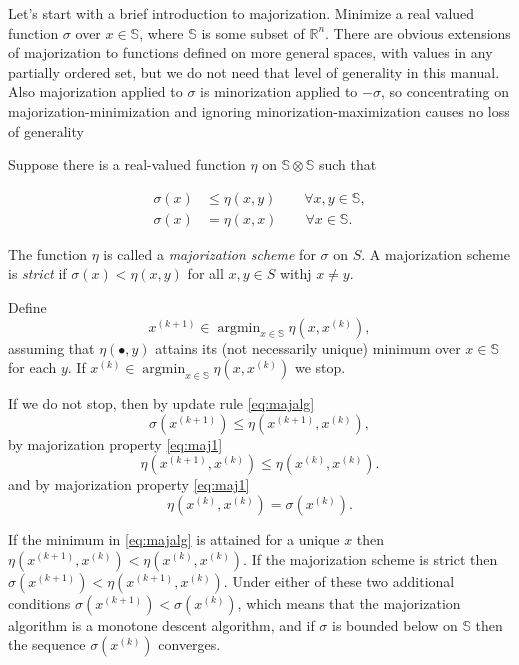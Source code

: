 \documentclass[
  12pt,
]{article}
\begin{document}
Let's start with a brief introduction to majorization. Minimize a real valued function \(\sigma\) over \(x\in\mathbb{S}\), where \(\mathbb{S}\) is some subset of \(\mathbb{R}^n\).
There are obvious extensions of majorization to functions defined on more general spaces, with values in any partially ordered set, but we do not need that level of generality in this manual. Also majorization applied to \(\sigma\) is minorization applied to \(-\sigma\), so concentrating
on majorization-minimization and ignoring minorization-maximization causes no loss of generality

Suppose there is a real-valued function
\(\eta\) on \(\mathbb{S}\otimes\mathbb{S}\) such that

\begin{align}
\sigma(x)&\leq\eta(x,y)\qquad\forall x,y\in\mathbb{S},\label{eq:maj1}\\
\sigma(x)&=\eta(x,x)\qquad\forall x\in\mathbb{S}.\label{eq:maj2}
\end{align}

The function \(\eta\) is called a \emph{majorization scheme} for \(\sigma\) on \(S\). A
majorization scheme is \emph{strict} if \(\sigma(x)<\eta(x,y)\) for all \(x,y\in S\)
withj \(x\not=y\).

Define
\begin{equation}
x^{(k+1)}\in\mathop{\text{argmin}}_{x\in\mathbb{S}}\eta(x,x^{(k)}),
\label{eq:majalg}
\end{equation}
assuming that \(\eta(\bullet,y)\) attains its (not necessarily unique) minimum over \(x\in\mathbb{S}\) for each \(y\). If \(x^{(k)}\in\mathop{\text{argmin}}_{x\in\mathbb{S}}\eta(x,x^{(k)})\) we stop.

If we do not stop, then by update rule \eqref{eq:majalg}
\begin{equation}
\sigma(x^{(k+1)})\leq\eta(x^{(k+1)},x^{(k)}),
\end{equation}
by majorization property \eqref{eq:maj1}
\begin{equation}
\eta(x^{(k+1)},x^{(k)})\leq\eta(x^{(k)},x^{(k)}).
\end{equation}
and by majorization property \eqref{eq:maj1}
\begin{equation}
\eta(x^{(k)},x^{(k)})=\sigma(x^{(k)}).
\end{equation}

If the minimum in \eqref{eq:majalg} is attained for a unique \(x\) then
\(\eta(x^{(k+1)},x^{(k)})<\eta(x^{(k)},x^{(k)})\).
If the majorization scheme is strict then \(\sigma(x^{(k+1)})<\eta(x^{(k+1)},x^{(k)})\).
Under either of these two additional conditions \(\sigma(x^{(k+1)})<\sigma(x^{(k)})\),
which means that the majorization algorithm is a monotone descent algorithm, and if
\(\sigma\) is bounded below on \(\mathbb{S}\) then the sequence \(\sigma(x^{(k)})\)
converges.
\end{document}
